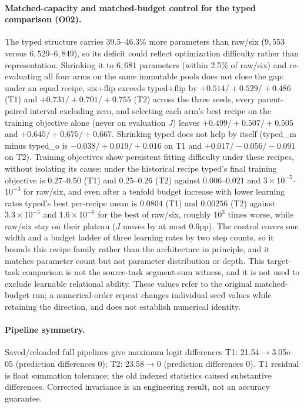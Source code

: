 \paragraph{Matched-capacity and matched-budget control for the typed comparison (O02).} The typed structure carries 39.5--46.3\% more parameters than raw/six ($9{,}553$ versus $6{,}529$--$6{,}849$), so its deficit could reflect optimization difficulty rather than representation. Shrinking it to $6{,}681$ parameters (within 2.5\% of raw/six) and re-evaluating all four arms on the same immutable pools does not close the gap: under an equal recipe, six+flip exceeds typed+flip by $+0.514/+0.529/+0.486$ (T1) and $+0.731/+0.701/+0.755$ (T2) across the three seeds, every parent-paired interval excluding zero, and selecting each arm's best recipe on the training objective alone (never on evaluation $J$) leaves $+0.499/+0.507/+0.505$ and $+0.645/+0.675/+0.667$. Shrinking typed does not help by itself (typed\_m minus typed\_o is $-0.038/+0.019/+0.016$ on T1 and $+0.017/-0.056/-0.091$ on T2). Training objectives show persistent fitting difficulty under these recipes, without isolating its cause: under the historical recipe typed's final training objective is $0.27$--$0.50$ (T1) and $0.25$--$0.26$ (T2) against $0.006$--$0.021$ and $3\times10^{-5}$--$10^{-3}$ for raw/six, and even after a tenfold budget increase with lower learning rates typed's best per-recipe mean is $0.0804$ (T1) and $0.00256$ (T2) against $3.3\times10^{-5}$ and $1.6\times10^{-6}$ for the best of raw/six, roughly $10^{3}$ times worse, while raw/six stay on their plateau ($J$ moves by at most $0.6$pp). The control covers one width and a budget ladder of three learning rates by two step counts, so it bounds this recipe family rather than the architecture in principle, and it matches parameter count but not parameter distribution or depth. This target-task comparison is not the source-task segment-sum witness, and it is not used to exclude learnable relational ability. These values refer to the original matched-budget run; a numerical-order repeat changes individual seed values while retaining the direction, and does not establish numerical identity.
\paragraph{Pipeline symmetry.} Saved/reloaded full pipelines give maximum logit differences T1: 21.54$\to$3.05e-05 (prediction differences 0); T2: 23.58$\to$0 (prediction differences 0). T1 residual is float summation tolerance; the old indexed statistics caused substantive differences. Corrected invariance is an engineering result, not an accuracy guarantee.
